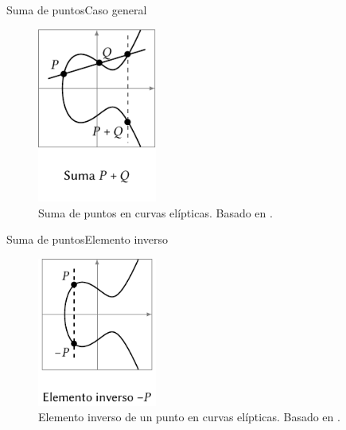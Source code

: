 \documentclass[spanish]{beamer}
\begin{document}
\begin{frame}{Suma de puntos}{Caso general}
  \begin{figure}[h]
    \centering
    \includegraphics[width=0.35\textwidth]{img/suma-curvas}
    \caption{Suma de puntos en curvas elípticas. Basado en  \parencite{eichlseder_elliptic_2016}.}
    \label{fig:suma-curvas}
  \end{figure}  
\end{frame}

\begin{frame}{Suma de puntos}{Elemento inverso}
  \begin{figure}[h]
    \centering
    \includegraphics[width=0.35\textwidth]{img/inverso-curvas}
    \caption{Elemento inverso de un punto en curvas elípticas. Basado en  \parencite{eichlseder_elliptic_2016}.}
    \label{fig:inverso-curvas}
  \end{figure}  
\end{frame}
\end{document}
